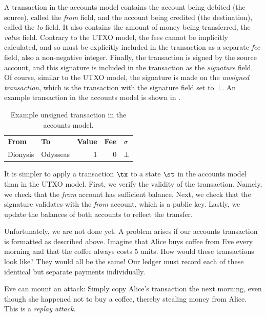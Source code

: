 A transaction in the accounts
model contains the account being debited (the source), called the \emph{from} field, and the account
being credited (the destination), called the \emph{to} field. It also contains the amount of money being transferred,
the \emph{value} field. Contrary to the UTXO model, the fees cannot be implicitly calculated, and
so must be explicitly included in the transaction as a separate \emph{fee} field, also a non-negative
integer. Finally, the transaction is signed by the source account, and this signature is included in
the transaction as the \emph{signature} field. Of course, similar to the UTXO model, the signature is
made on the \emph{unsigned transaction}, which is the transaction with the signature field set to $\bot$.
An example transaction in the accounts model is shown in .

\begin{table}[htbp!]
\centering
    \begin{tabular}{|l|l|r|r|l|}
         \hline
         \textbf{From} & \textbf{To} & \textbf{Value} & \textbf{Fee} & \textbf{$\sigma$} \\
         \hhline{|=|=|=|=|=|}
         Dionysis & Odysseas & 1 & 0 & $\bot$ \\
         \hline
    \end{tabular}
    \caption{Example unsigned transaction in the accounts model.}
    \label{tbl.accountsTx}
\end{table}

It is simpler to apply a transaction $\tx$ to a state $\st$ in the accounts model than in the UTXO model.
First, we verify the validity of the transaction. Namely, we check that the \emph{from} account has sufficient balance.
Next, we check that the signature validates with the \emph{from} account, which is a public key. Lastly, we
update the balances of both accounts to reflect the transfer.

Unfortunately, we are not done yet.
A problem arises if our accounts transaction is formatted as described above. Imagine that Alice buys coffee
from Eve every morning and that the coffee always costs $5$ units. How would these transactions look like?
They would all be the same! Our ledger must record each of these identical but separate payments individually.

Eve can mount an attack: Simply copy Alice's transaction the next
morning, even though she happened not to buy a coffee, thereby stealing money from Alice. This is a \emph{replay attack}.

